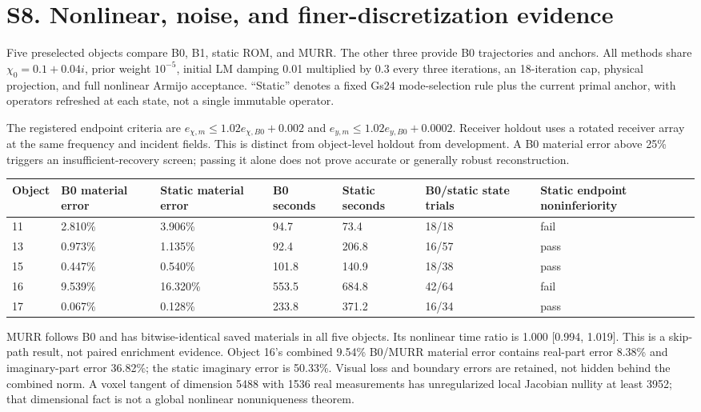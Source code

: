 \documentclass[11pt]{article}
\begin{document}
\section*{S8. Nonlinear, noise, and finer-discretization evidence}

Five preselected objects compare B0, B1, static ROM, and MURR. The other three provide B0 trajectories and anchors. All methods share \(\chi_0=0.1+0.04i\), prior weight \(10^{-5}\), initial LM damping 0.01 multiplied by 0.3 every three iterations, an 18-iteration cap, physical projection, and full nonlinear Armijo acceptance. ``Static'' denotes a fixed Gs24 mode-selection rule plus the current primal anchor, with operators refreshed at each state, not a single immutable operator.

The registered endpoint criteria are \(e_{\chi,m}\le1.02e_{\chi,B0}+0.002\) and \(e_{y,m}\le1.02e_{y,B0}+0.0002\). Receiver holdout uses a rotated receiver array at the same frequency and incident fields. This is distinct from object-level holdout from development. A B0 material error above 25\% triggers an insufficient-recovery screen; passing it alone does not prove accurate or generally robust reconstruction.

\begin{table}[tbp]\centering\footnotesize\setlength{\tabcolsep}{3pt}
\begin{tabularx}{\linewidth}{lXXXXXX}\toprule
Object & B0 material error & Static material error & B0 seconds & Static seconds & B0/static state trials & Static endpoint noninferiority \\\midrule
11 & 2.810\% & 3.906\% & 94.7 & 73.4 & 18/18 & fail \\
13 & 0.973\% & 1.135\% & 92.4 & 206.8 & 16/57 & pass \\
15 & 0.447\% & 0.540\% & 101.8 & 140.9 & 18/38 & pass \\
16 & 9.539\% & 16.320\% & 553.5 & 684.8 & 42/64 & fail \\
17 & 0.067\% & 0.128\% & 233.8 & 371.2 & 16/34 & pass \\
\bottomrule\end{tabularx}
\end{table}

MURR follows B0 and has bitwise-identical saved materials in all five objects. Its nonlinear time ratio is 1.000 [0.994, 1.019]. This is a skip-path result, not paired enrichment evidence. Object 16's combined 9.54\% B0/MURR material error contains real-part error 8.38\% and imaginary-part error 36.82\%; the static imaginary error is 50.33\%. Visual loss and boundary errors are retained, not hidden behind the combined norm. A voxel tangent of dimension 5488 with 1536 real measurements has unregularized local Jacobian nullity at least 3952; that dimensional fact is not a global nonlinear nonuniqueness theorem.
\end{document}
